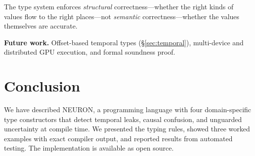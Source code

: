 \documentclass[11pt,a4paper]{article}
\begin{document}
The type system enforces \emph{structural} correctness---whether the right kinds of values flow to the right places---not \emph{semantic} correctness---whether the values themselves are accurate.

\textbf{Future work.} Offset-based temporal types (\S\ref{sec:temporal}), multi-device and distributed GPU execution, and formal soundness proof.


\section{Conclusion}

We have described NEURON, a programming language with four domain-specific type constructors that detect temporal leaks, causal confusion, and unguarded uncertainty at compile time. We presented the typing rules, showed three worked examples with exact compiler output, and reported results from automated testing. The implementation is available as open source.

\end{document}
